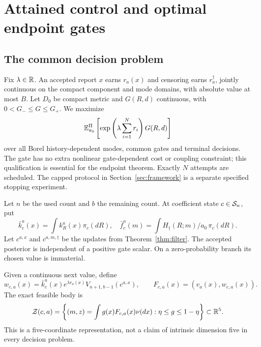 \section{Attained control and optimal endpoint gates}\label{sec:control}
\subsection{The common decision problem}
Fix $\lambda\in\mathbb R$. An accepted report $x$ earns $r_a(x)$ and censoring earns $r_a^\dagger$, jointly continuous on the compact component and mode domains, with absolute value at most $B$. Let $D_0$ be compact metric and $G(R,d)$ continuous, with $0<G_-\le G\le G_+$. We maximize
\begin{equation}
 \mathbb E_{\pi_0}^{\Pi}\left[\exp\left(\lambda\sum_{i=1}^N r_i\right)G(R,d)\right]
 \label{eq:criterion}
\end{equation}
over all Borel history-dependent modes, common gates and terminal decisions. The gate has no extra nonlinear gate-dependent cost or coupling constraint; this qualification is essential for the endpoint theorem. Exactly $N$ attempts are scheduled. The capped protocol in Section~\ref{sec:framework} is a separate specified stopping experiment.

Let $n$ be the used count and $b$ the remaining count. At coefficient state $c\in\mathcal S_n$, put
\[
 \bar k_c^a(x)=\int k_R^a(x)\pi_c(dR),\quad
 \bar f_c^a(m)=\int H_\dagger(R;m)/a_0\,\pi_c(dR).
\]
Let $c^{a,x}$ and $c^{a,m,\dagger}$ be the updates from Theorem~\ref{thm:filter}. The accepted posterior is independent of a positive gate scalar. On a zero-probability branch its chosen value is immaterial.

Given a continuous next value, define
\[
 w_{c,a}(x)=\bar k_c^a(x)e^{\lambda r_a(x)}V_{n+1,b-1}(c^{a,x}),\qquad
 F_{c,a}(x)=(v_a(x),w_{c,a}(x)).
\]
The exact feasible body is
\begin{equation}
 \mathcal Z(c,a)=\left\{(m,z)=\int g(x)F_{c,a}(x)\nu(dx):\eta\le g\le1-\eta\right\}
 \subset\mathbb R^5.
 \label{eq:body}
\end{equation}
This is a five-coordinate representation, not a claim of intrinsic dimension five in every decision problem.

